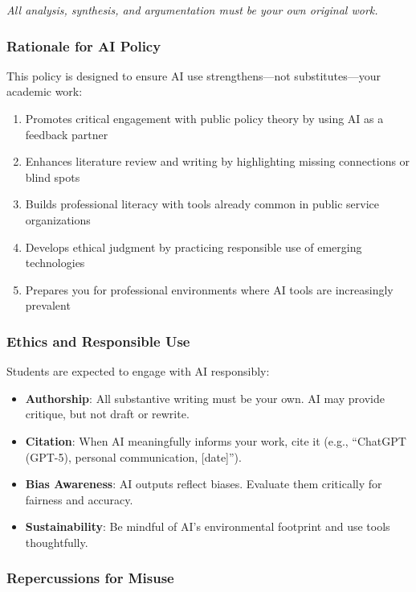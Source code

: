 \documentclass[12pt]{article}     %
\begin{document}
\textit{All analysis, synthesis, and argumentation must be your own original work.}

\subsubsection*{Rationale for AI Policy}

This policy is designed to ensure AI use strengthens---not substitutes---your academic work:

\begin{enumerate}
    \item Promotes critical engagement with public policy theory by using AI as a feedback partner
    \item Enhances literature review and writing by highlighting missing connections or blind spots
    \item Builds professional literacy with tools already common in public service organizations
    \item Develops ethical judgment by practicing responsible use of emerging technologies
    \item Prepares you for professional environments where AI tools are increasingly prevalent
\end{enumerate}

\subsubsection*{Ethics and Responsible Use}

\noindent Students are expected to engage with AI responsibly:

\begin{itemize}
    \item \textbf{Authorship}: All substantive writing must be your own. AI may provide critique, but not draft or rewrite.
    \item \textbf{Citation}: When AI meaningfully informs your work, cite it (e.g., ``ChatGPT (GPT-5), personal communication, [date]'').
    \item \textbf{Bias Awareness}: AI outputs reflect biases. Evaluate them critically for fairness and accuracy.
    \item \textbf{Sustainability}: Be mindful of AI's environmental footprint and use tools thoughtfully.
\end{itemize}

\subsubsection*{Repercussions for Misuse}
\end{document}
